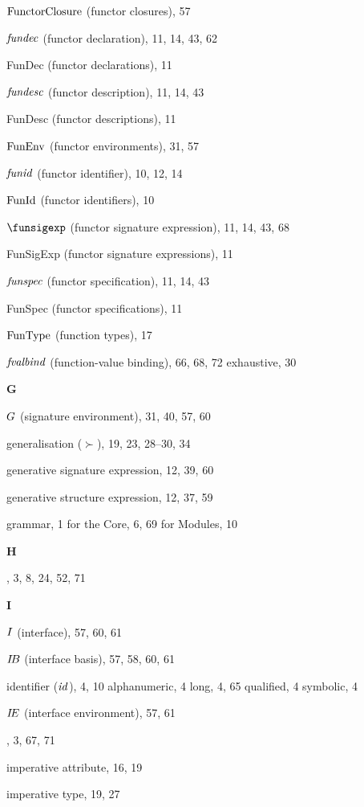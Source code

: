\begin{theindex}
\item ${\rm FunctorClosure}$ (functor closures), 57
\item ${\it fundec}$ (functor declaration), 11, 14, 43, 62
\item FunDec (functor declarations), 11
\item ${\it fundesc}$ (functor description), 11, 14, 43
\item FunDesc (functor descriptions), 11
\item ${\rm FunEnv}$ (functor environments), 31, 57
\item ${\it funid}$ (functor identifier), 10, 12, 14
\item ${\rm FunId}$ (functor identifiers), 10
\item $\funsigexp$ (functor signature expression), 11, 14, 43, 68
\item FunSigExp (functor signature expressions), 11
\item ${\it funspec}$ (functor specification), 11, 14, 43
\item FunSpec (functor specifications), 11
\item ${\rm FunType}$ (function types), 17
\item ${\it fvalbind}$ (function-value binding), 66, 68, 72
\subitem exhaustive, 30
\indexspace
\indexspace
\indexspace
\parbox{65mm}{\hfil{\large\bf G}\hfil}
\indexspace
\item $G$ (signature environment), 31, 40, 57, 60
\item generalisation ($\succ$), 19, 23, 28--30, 34
\item generative signature expression, 12, 39, 60
\item generative structure expression, 12, 37, 59
\item grammar, 1
\subitem for the Core, 6, 69
\subitem for Modules, 10
\indexspace
\parbox{65mm}{\hfil{\large\bf H}\hfil}
\indexspace
\item \HANDLE, 3, 8, 24, 52, 71
\indexspace
\parbox{65mm}{\hfil{\large\bf I}\hfil}
\indexspace
\item $I$ (interface), 57, 60, 61
\item $\mbox{$I\!B$}$ (interface basis), 57, 58, 60, 61
\item identifier (${\it id}$), 4, 10
\subitem alphanumeric, 4
\subitem long, 4, 65
\subitem qualified, 4
\subitem symbolic, 4
\item $\mbox{$I\!E$}$ (interface environment), 57, 61
\item \IF, 3, 67, 71
\item imperative attribute, 16, 19
\item imperative type, 19, 27

\end{theindex}

